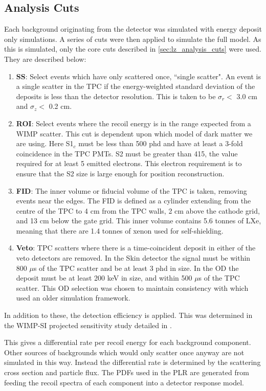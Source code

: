 

\subsection{Analysis Cuts}
\par
Each background originating from the detector was simulated with energy deposit only simulations.
A series of cuts were then applied to simulate the full model.
As this is simulated, only the core cuts described in \autoref{sec:lz_analysis_cuts} were used.
They are described below:

\begin{enumerate}
    \item \textbf{SS}: Select events which have only scattered once, ``single scatter". An event is a single scatter in the TPC if the energy-weighted standard deviation of the deposits is less than the detector resolution. This is taken to be $\sigma_r <$ 3.0 cm and $\sigma_z <$ 0.2 cm.
    \item \textbf{ROI}: Select events where the recoil energy is in the range expected from a WIMP scatter. This cut is dependent upon which model of dark matter we are using. Here S1$_c$ must be less than 500 phd and have at least a 3-fold coincidence in the TPC PMTs. S2 must be greater than 415, the value required for at least 5 emitted electrons. This electron requirement is to ensure that the S2 size is large enough for position reconstruction.
    \item \textbf{FID}: The inner volume or fiducial volume of the TPC is taken, removing events near the edges. The FID is defined as a cylinder extending from the centre of the TPC to 4 cm from the TPC walls, 2 cm above the cathode grid, and 13 cm below the gate grid. This inner volume contains 5.6 tonnes of LXe, meaning that there are 1.4 tonnes of xenon used for self-shielding.
    \item \textbf{Veto}: TPC scatters where there is a time-coincident deposit in either of the veto detectors are removed. In the Skin detector the signal must be within 800 $\mu$s of the TPC scatter and be at least 3 phd in size. In the OD the deposit must be at least 200 keV in size, and within 500 $\mu$s of the TPC scatter. This OD selection was chosen to maintain consistency with \cite{LZ_projected_sensitivity_paper_ref} which used an older simulation framework.
\end{enumerate}
In addition to these, the detection efficiency is applied.
This was determined in the WIMP-SI projected sensitivity study detailed in \cite{LZ_projected_sensitivity_paper_ref}.
\par
This gives a differential rate per recoil energy for each background component.
Other sources of backgrounds which would only scatter once anyway are not simulated in this way.
Instead the differential rate is determined by the scattering cross section and particle flux.
The PDFs used in the PLR are generated from feeding the recoil spectra of each component into a detector response model.

